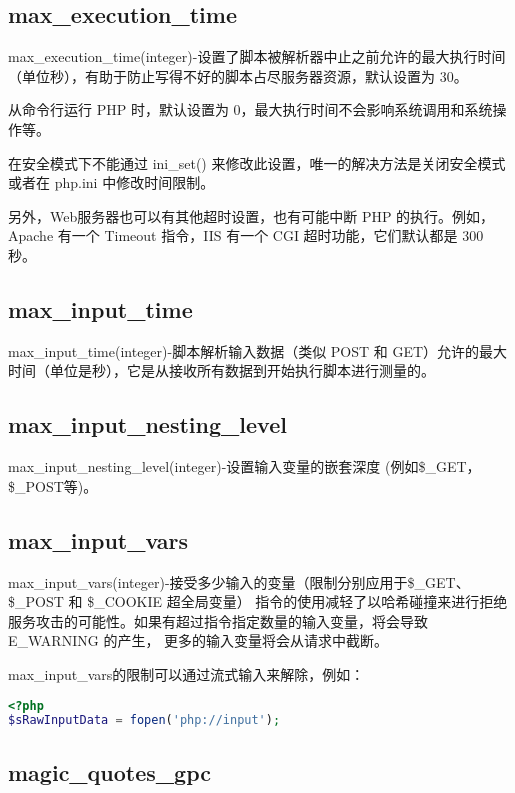 \subsection{max\_execution\_time}


max\_execution\_time(integer)-设置了脚本被解析器中止之前允许的最大执行时间（单位秒），有助于防止写得不好的脚本占尽服务器资源，默认设置为 30。

从命令行运行 PHP 时，默认设置为 0，最大执行时间不会影响系统调用和系统操作等。

在安全模式下不能通过 ini\_set() 来修改此设置，唯一的解决方法是关闭安全模式或者在 php.ini 中修改时间限制。

另外，Web服务器也可以有其他超时设置，也有可能中断 PHP 的执行。例如，Apache 有一个 Timeout 指令，IIS 有一个 CGI 超时功能，它们默认都是 300 秒。

\subsection{max\_input\_time}


max\_input\_time(integer)-脚本解析输入数据（类似 POST 和 GET）允许的最大时间（单位是秒），它是从接收所有数据到开始执行脚本进行测量的。

\subsection{max\_input\_nesting\_level}

max\_input\_nesting\_level(integer)-设置输入变量的嵌套深度 (例如\$\_GET，\$\_POST等)。

\subsection{max\_input\_vars}

max\_input\_vars(integer)-接受多少输入的变量（限制分别应用于\$\_GET、\$\_POST 和 \$\_COOKIE 超全局变量） 指令的使用减轻了以哈希碰撞来进行拒绝服务攻击的可能性。如果有超过指令指定数量的输入变量，将会导致 E\_WARNING 的产生， 更多的输入变量将会从请求中截断。

max\_input\_vars的限制可以通过流式输入来解除，例如：

\begin{lstlisting}[language=PHP]
<?php
$sRawInputData = fopen('php://input');
\end{lstlisting}

\subsection{magic\_quotes\_gpc}

